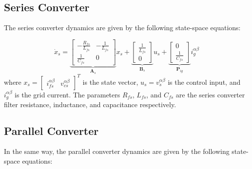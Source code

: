 \subsection{Series Converter}

The series converter dynamics are given by the following state-space equations:

\begin{equation}
    \dot{x}_s =
    \underbrace{
    \begin{bmatrix}
        -\frac{R_{fs}}{L_{fs}} & -\frac{1}{L_{fs}} \\
        \frac{1}{C_{fs}} & 0
    \end{bmatrix}
    }_{\mathbf{A}_s}
    x_s +
    \underbrace{
    \begin{bmatrix}
        \frac{1}{L_{fs}}\\
        0
    \end{bmatrix}
    }_{\mathbf{B}_s}
    u_s +
    \underbrace{
    \begin{bmatrix}
        0 \\
        \frac{1}{C_{fs}}
    \end{bmatrix}
    }_{\mathbf{P}_{ig}}
    i_g^{\alpha\beta} \label{eq:SeriesConverter_Dynamics}
\end{equation}
where $x_s = \begin{bmatrix} i_{fs}^{\alpha\beta} & v_{cs}^{\alpha\beta} \end{bmatrix}^T$ is the state vector, $u_s = v_s^{\alpha\beta}$ is the control input, and $i_g^{\alpha\beta}$ is the grid current. The parameters $R_{fs}$, $L_{fs}$, and $C_{fs}$ are the series converter filter resistance, inductance, and capacitance respectively.

\subsection{Parallel Converter}

In the same way, the parallel converter dynamics are given by the following state-space equations:


